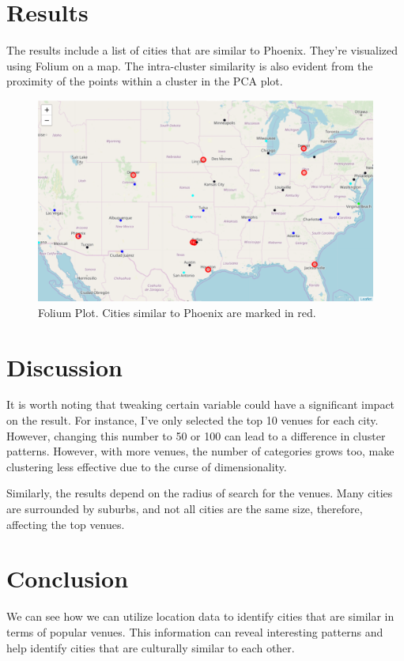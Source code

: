 \documentclass[12pt, a4paper]{report}
\begin{document}
\section*{Results}
The results include a list of cities that are similar to Phoenix. They're visualized using Folium on a map. The intra-cluster similarity is also evident from the proximity of the points within a cluster in the PCA plot. 

\begin{figure}[H]
	\includegraphics[width=500px]{map}
	\caption{Folium Plot. Cities similar to Phoenix are marked in red. }
\end{figure}

\section*{Discussion}
It is worth noting that tweaking certain variable could have a significant impact on the result. For instance, I've only selected the top 10 venues for each city. However, changing this number to 50 or 100 can lead to a difference in cluster patterns. However, with more venues, the number of categories grows too, make clustering less effective due to the curse of dimensionality. 

Similarly, the results depend on the radius of search for the venues. Many cities are surrounded by suburbs, and not all cities are the same size, therefore, affecting the top venues. 

\section*{Conclusion}
We can see how we can utilize location data to identify cities that are similar in terms of popular venues. This information can reveal interesting patterns and help identify cities that are culturally similar to each other. 
\end{document}
